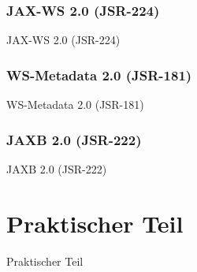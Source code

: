 \documentclass[ucs]{beamer}
\begin{document}
  \subsubsection{JAX-WS 2.0 (JSR-224)}
  \begin{frame}{JAX-WS 2.0 (JSR-224)}
  \end{frame}

  \subsubsection{WS-Metadata 2.0 (JSR-181)}
  \begin{frame}{WS-Metadata 2.0 (JSR-181)}
  \end{frame}

  \subsubsection{JAXB 2.0 (JSR-222)}
  \begin{frame}{JAXB 2.0 (JSR-222)}
  \end{frame}


  \section{Praktischer Teil}
  \begin{frame}{Praktischer Teil}
  \end{frame}
\end{document}
